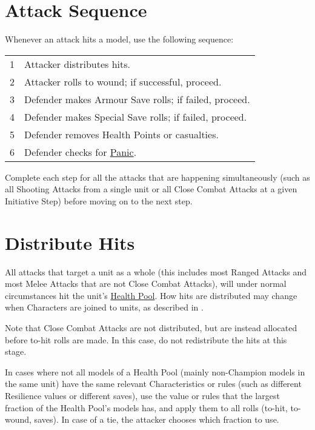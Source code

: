 \newpage
\section{Attack Sequence}
\label{attack_sequence}

Whenever an attack hits a model, use the following sequence:

\hspace*{0.3cm}\begin{tabular}{c|m{14cm}}
1 & Attacker distributes hits.\\
2 & Attacker rolls to wound; if successful, proceed.\\
3 & Defender makes Armour Save rolls; if failed, proceed.\\
4 & Defender makes Special Save rolls; if failed, proceed.\\
5 & Defender removes Health Points or casualties.\\
6 & Defender checks for \hyperref[panic_test]{Panic}.\\
\end{tabular}

Complete each step for all the attacks that are happening simultaneously (such as all Shooting Attacks from a single unit or all Close Combat Attacks at a given Initiative Step) before moving on to the next step.

\section{Distribute Hits}
\label{distribute_hits}

All attacks that target a unit as a whole (this includes most Ranged Attacks and most Melee Attacks that are not Close Combat Attacks), will under normal circumstances hit the unit's \rnf{} \hyperref[health_pools]{Health Pool}. How hits are distributed may change when Characters are joined to units, as described in .

Note that Close Combat Attacks are not distributed, but are instead allocated before to-hit rolls are made. In this case, do not redistribute the hits at this stage.

In cases where not all models of a Health Pool (mainly non-Champion \rnf{} models in the same unit) have the same relevant Characteristics or rules (such as different Resilience values or different saves), use the value or rules that the largest fraction of the Health Pool's models has, and apply them to all rolls (to-hit, to-wound, saves). In case of a tie, the attacker chooses which fraction to use.

